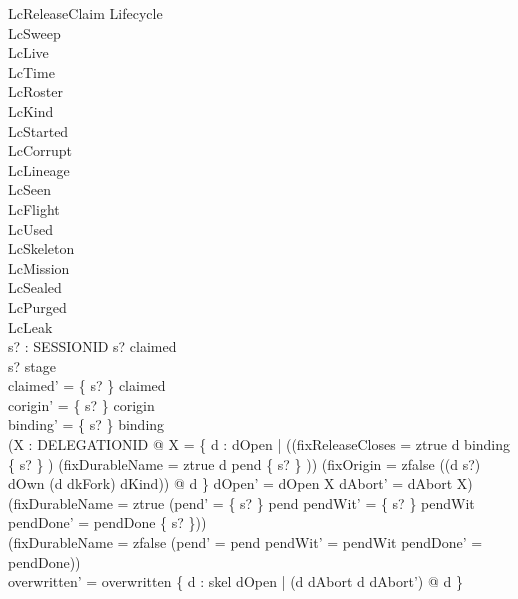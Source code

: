 \documentclass[a4paper,10pt,fleqn]{article}
\begin{document}
\begin{schema}{LcReleaseClaim}
\Delta Lifecycle \\
\Xi LcSweep \\
\Xi LcLive \\
\Xi LcTime \\
\Xi LcRoster \\
\Xi LcKind \\
\Xi LcStarted \\
\Xi LcCorrupt \\
\Xi LcLineage \\
\Xi LcSeen \\
\Xi LcFlight \\
\Xi LcUsed \\
\Xi LcSkeleton \\
\Xi LcMission \\
\Xi LcSealed \\
\Xi LcPurged \\
\Xi LcLeak \\
s? : SESSIONID
\where
s? \in \dom claimed \\
s? \notin \dom stage \\
claimed' = \{ s? \} \ndres claimed \\
corigin' = \{ s? \} \ndres corigin \\
binding' = \{ s? \} \ndres binding \\
(\exists X : \power DELEGATIONID @ X = \{ d : dOpen | ((fixReleaseCloses = ztrue \land d \in binding \limg \{ s? \} \rimg) \lor (fixDurableName = ztrue \land d \in pend \limg \{ s? \} \rimg)) \land (fixOrigin = zfalse \lor ((d \mapsto s?) \in dOwn \land (d \mapsto dkFork) \in dKind)) @ d \} \land dOpen' = dOpen \setminus X \land dAbort' = dAbort \cup X) \\
(fixDurableName = ztrue \implies (pend' = \{ s? \} \ndres pend \land pendWit' = \{ s? \} \ndres pendWit \land pendDone' = pendDone \setminus \{ s? \})) \\
(fixDurableName = zfalse \implies (pend' = pend \land pendWit' = pendWit \land pendDone' = pendDone)) \\
overwritten' = overwritten \cup \{ d : skel \setminus dOpen | (d \in dAbort \iff d \notin dAbort') @ d \}
\end{schema}
\end{document}
